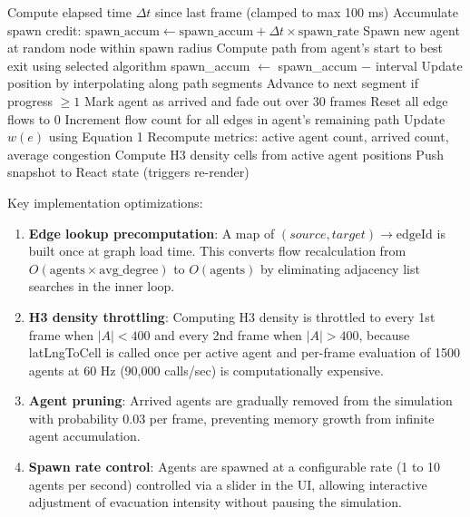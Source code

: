 \documentclass[conference]{IEEEtran}
\begin{document}
\begin{algorithmic}
  \STATE Compute elapsed time $\Delta t$ since last frame (clamped to max 100 ms)
  \STATE Accumulate spawn credit: $\text{spawn\_accum} \gets \text{spawn\_accum} + \Delta t \times \text{spawn\_rate}$
    \STATE Spawn new agent at random node within spawn radius
    \STATE Compute path from agent's start to best exit using selected algorithm
    \STATE spawn\_accum $\gets$ spawn\_accum $-$ interval
  \ENDWHILE
      \STATE Update position by interpolating along path segments
      \STATE Advance to next segment if progress $\geq 1$
        \STATE Mark agent as arrived and fade out over 30 frames
      \ENDIF
    \ENDIF
  \ENDFOR
  \STATE Reset all edge flows to 0
    \STATE Increment flow count for all edges in agent's remaining path
  \ENDFOR
    \STATE Update $w(e)$ using Equation 1
  \ENDFOR
  \STATE Recompute metrics: active agent count, arrived count, average congestion
    \STATE Compute H3 density cells from active agent positions
  \ENDIF
  \STATE Push snapshot to React state (triggers re-render)
\ENDFOR
\end{algorithmic}

Key implementation optimizations:

\begin{enumerate}
\item \textbf{Edge lookup precomputation}: A map of $(source, target) \to \text{edgeId}$ is built once at graph load time. This converts flow recalculation from $O(\text{agents} \times \text{avg\_degree})$ to $O(\text{agents})$ by eliminating adjacency list searches in the inner loop.

\item \textbf{H3 density throttling}: Computing H3 density is throttled to every 1st frame when $|A| < 400$ and every 2nd frame when $|A| > 400$, because latLngToCell is called once per active agent and per-frame evaluation of 1500 agents at 60 Hz (90,000 calls/sec) is computationally expensive.

\item \textbf{Agent pruning}: Arrived agents are gradually removed from the simulation with probability 0.03 per frame, preventing memory growth from infinite agent accumulation.

\item \textbf{Spawn rate control}: Agents are spawned at a configurable rate (1 to 10 agents per second) controlled via a slider in the UI, allowing interactive adjustment of evacuation intensity without pausing the simulation.
\end{enumerate}
\end{document}
